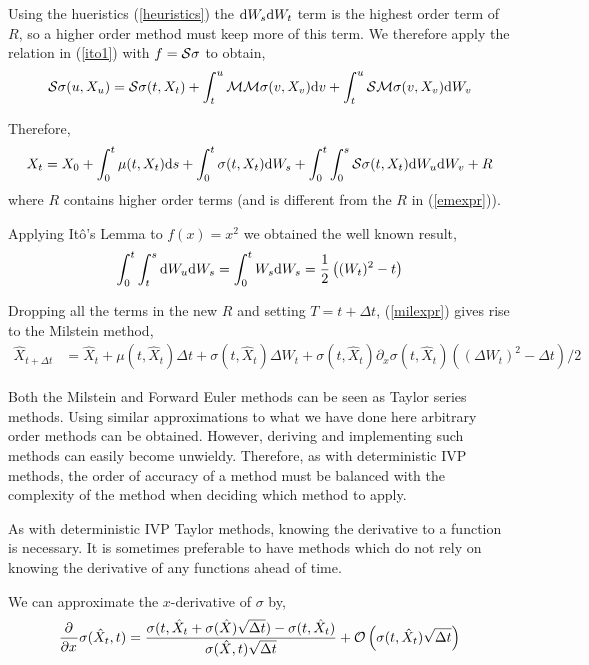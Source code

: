 \documentclass[12pt]{article}
\begin{document}
Using the hueristics (\ref{heuristics}) the \( \mathrm{d} W_s \mathrm{d} W_t \) term is the highest order term of \( R \), so a higher order method must keep more of this term. We therefore apply the relation in (\ref{ito1}) with \( f = \mathcal{S} \sigma \) to obtain,
\begin{align*}
    \mathcal{S} \sigma(u,X_u) = \mathcal{S} \sigma(t,X_t) + \int_{t}^{u} \mathcal{M} \mathcal{M} \sigma(v,X_v) \mathrm{d} v + \int_t^u \mathcal{S} \mathcal{M} \sigma(v,X_v) \mathrm{d} W_v
\end{align*}

Therefore,
\begin{align}
    X_t = X_0 + \int_0^t \mu(t,X_t) \mathrm{d} s + \int_0^t \sigma(t,X_t) \mathrm{d} W_s + \int_0^t \int_0^s \mathcal{S} \sigma(t,X_t)  \mathrm{d} W_u \mathrm{d} W_v + R \label{milexpr}
\end{align}
where \( R \) contains higher order terms (and is different from the \( R \) in (\ref{emexpr})).


Applying It\^o's Lemma to \( f(x) = x^2 \) we obtained the well known result,
\begin{align*}
    \int_0^t \int_t^s \mathrm{d} W_u \mathrm{d} W_s
    = \int_0^t W_{s} \mathrm{d} W_s
    = \dfrac{1}{2} \left( (W_{t})^2 - t \right)
\end{align*}

Dropping all the terms in the new \( R \) and setting \( T = t+\Delta t \), (\ref{milexpr}) gives rise to the  Milstein method,
\begin{align*}
    \hat{X}_{t+\Delta t} &= \hat{X}_t + \mu(t,\hat{X}_{t}) \Delta t + \sigma(t,\hat{X}_{t}) \Delta W_{t} + \sigma(t,\hat{X}_t) \partial_x \sigma(t,\hat{X}_t) \left( (\Delta W_t)^2 - \Delta t \right)/2
\end{align*}

Both the Milstein and Forward Euler methods can be seen as Taylor series methods. Using similar approximations to what we have done here arbitrary order methods can be obtained. However, deriving and implementing such methods can easily become unwieldy. Therefore, as with deterministic IVP methods, the order of accuracy of a method must be balanced with the complexity of the method when deciding which method to apply.

As with deterministic IVP Taylor methods, knowing the derivative to a function is necessary. It is sometimes preferable to have methods which do not rely on knowing the derivative of any functions ahead of time.

We can approximate the \( x \)-derivative of \( \sigma \) by,
\begin{align}
    \frac{\partial^{}}{\partial x^{}}\sigma(\hat{X}_t,t) = \dfrac{\sigma(t,\hat{X}_t + \sigma(\hat{X})\sqrt{\Delta t}) - \sigma(t,\hat{X}_t)}{\sigma(\hat{X},t)\sqrt{\Delta t}} + \mathcal{O}\left(\sigma(t,\hat{X}_t)\sqrt{\Delta t}\right) \label{derivapprox}
\end{align}
\end{document}
